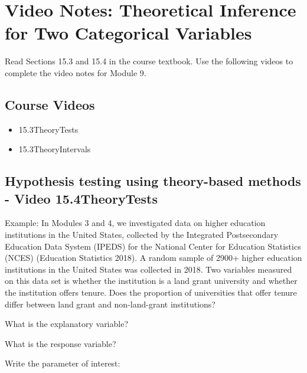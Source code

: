\documentclass[
]{report}
\begin{document}
\section{Video Notes: Theoretical Inference for Two Categorical Variables}\label{video-notes-theoretical-inference-for-two-categorical-variables}

Read Sections 15.3 and 15.4 in the course textbook. Use the following videos to complete the video notes for Module 9.

\subsection{Course Videos}\label{course-videos-3}

\begin{itemize}
\item
  15.3TheoryTests
\item
  15.3TheoryIntervals
\end{itemize}


\subsection*{Hypothesis testing using theory-based methods - Video 15.4TheoryTests}\label{hypothesis-testing-using-theory-based-methods---video-15.4theorytests}

Example: In Modules 3 and 4, we investigated data on higher education institutions in the United States, collected by the Integrated Postsecondary Education Data System (IPEDS) for the National Center for Education Statistics (NCES) (Education Statistics 2018). A random sample of 2900+ higher education institutions in the United States was collected in 2018. Two variables measured on this data set is whether the institution is a land grant university and whether the institution offers tenure. Does the proportion of universities that offer tenure differ between land grant and non-land-grant institutions?

What is the explanatory variable?

\vspace{0.2in}

What is the response variable?

\vspace{0.2in}

Write the parameter of interest:
\end{document}
